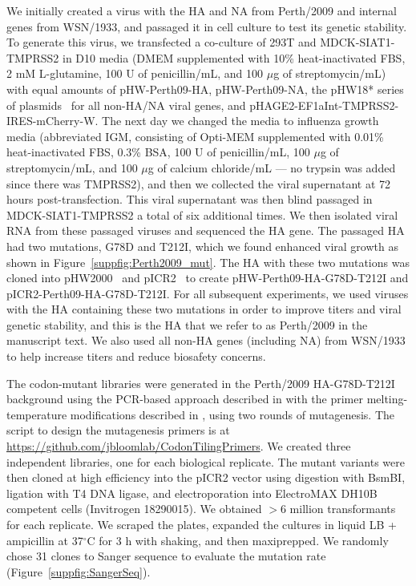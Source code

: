 \documentclass[9pt,twocolumn,twoside]{pnas-new}
\begin{document}
{We initially created a virus with the HA and NA from Perth/2009 and internal genes from WSN/1933, and passaged it in cell culture to test its genetic stability.
To generate this virus, we transfected a co-culture of 293T and MDCK-SIAT1-TMPRSS2 in D10 media (DMEM supplemented with 10\% heat-inactivated FBS, 2 mM L-glutamine, 100 U of penicillin/mL, and 100 $\mu$g of streptomycin/mL) with equal amounts of pHW-Perth09-HA, pHW-Perth09-NA, the pHW18* series of plasmids~\cite{hoffmann2000dna} for all non-HA/NA viral genes, and pHAGE2-EF1aInt-TMPRSS2-IRES-mCherry-W.
The next day we changed the media to influenza growth media (abbreviated IGM, consisting of Opti-MEM supplemented with 0.01\% heat-inactivated FBS, 0.3\% BSA, 100 U of penicillin/mL, 100 $\mu$g of streptomycin/mL, and 100 $\mu$g of calcium chloride/mL --- no trypsin was added since there was TMPRSS2), and then we collected the viral supernatant at 72 hours post-transfection.
This viral supernatant was then blind passaged in MDCK-SIAT1-TMPRSS2 a total of six additional times.
We then isolated viral RNA from these passaged viruses and sequenced the HA gene.
The passaged HA had two mutations, G78D and T212I, which we found enhanced viral growth as shown in Figure~\ref{suppfig:Perth2009_mut}.
The HA with these two mutations was cloned into pHW2000~\citep{hoffmann2000dna} and pICR2~\cite{ashenberg2017deep} to create pHW-Perth09-HA-G78D-T212I and pICR2-Perth09-HA-G78D-T212I.
For all subsequent experiments, we used viruses with the HA containing these two mutations in order to improve titers and viral genetic stability, and this is the HA that we refer to as Perth/2009 in the manuscript text.
We also used all non-HA genes (including NA) from WSN/1933 to help increase titers and reduce biosafety concerns.

The codon-mutant libraries were generated in the Perth/2009 HA-G78D-T212I background using the PCR-based approach described in \cite{bloom2014experimentally} with the primer melting-temperature modifications described in \cite{dingens2017comprehensive}, using two rounds of mutagenesis.
The script to design the mutagenesis primers is at \url{https://github.com/jbloomlab/CodonTilingPrimers}.
We created three independent libraries, one for each biological replicate.
The mutant variants were then cloned at high efficiency into the pICR2 vector using digestion with BsmBI, ligation with T4 DNA ligase, and electroporation into ElectroMAX DH10B competent cells (Invitrogen 18290015). 
We obtained $>$6 million transformants for each replicate.
We scraped the plates, expanded the cultures in liquid LB + ampicillin at 37$^{\circ}$C for 3 h with shaking, and then maxiprepped.
We randomly chose 31 clones to Sanger sequence to evaluate the mutation rate (Figure~\ref{suppfig:SangerSeq}).

}
\end{document}

